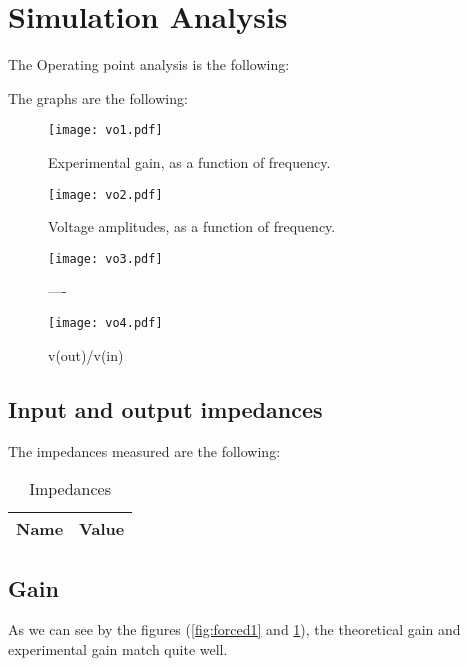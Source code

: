 \section{Simulation Analysis}
\label{sec:simulation}

The Operating point analysis is the following:


The graphs are the following:


\begin{figure}[H] \centering
\texttt{[image: vo1.pdf]}
\caption{Experimental gain, as a function of frequency.}
\label{fig:acm1}
\end{figure}


\begin{figure}[H] \centering
\texttt{[image: vo2.pdf]}
\caption{Voltage amplitudes, as a function of frequency.}
\label{fig:acm2}
\end{figure}


\begin{figure}[H] \centering
\texttt{[image: vo3.pdf]}
\caption{----}
\label{fig:acm}
\end{figure}

\begin{figure}[H] \centering
\texttt{[image: vo4.pdf]}
\caption{v(out)/v(in)}
\label{fig:acm}
\end{figure}

\subsection{Input and output impedances}
The impedances measured are the following:

\begin{table}[H]
  \centering
  \begin{tabular}{|l|r|}
    \hline    
    {\bf Name} & {\bf Value } \\ \hline
    
  \end{tabular}
  \caption{Impedances}
  \label{tab:op}
\end{table}

\subsection{Gain}
As we can see by the figures (\ref{fig:forced1} and \ref{fig:acm1}), the theoretical gain and experimental gain match quite well.

